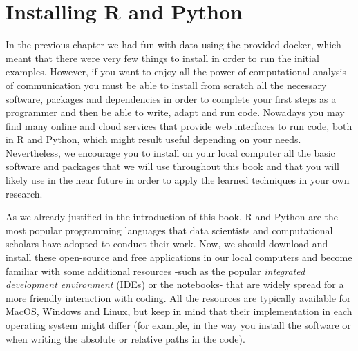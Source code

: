 \section{Installing R and Python}

In the previous chapter we had fun with data using the provided docker, which meant that there were very few things to install in order to run the initial examples. However, if you want to enjoy all the power of computational analysis of communication you must be able to install from scratch all the necessary software, packages and dependencies in order to complete your first steps as a programmer and then be able to write, adapt and run code. Nowadays you may find many online and cloud services that provide web interfaces to run code, both in R and Python, which might result useful depending on your needs. Nevertheless, we encourage you to install on your local computer all the basic software and packages that we will use throughout this book and that you will likely use in the near future in order to apply the learned techniques in your own research.  

As we already justified in the introduction of this book, R and Python are the most popular programming languages that data scientists and computational scholars have adopted to conduct their work.  Now, we should download and install these open-source and free applications in our local computers and become familiar with some additional resources -such as the popular \emph{integrated development environment} (IDEs) or the notebooks- that are widely spread for a more friendly interaction with coding. All the resources are typically available for MacOS, Windows and Linux, but keep in mind that their implementation in each operating system might differ (for example, in the way you install the software or when writing the absolute or relative paths in the code). 

